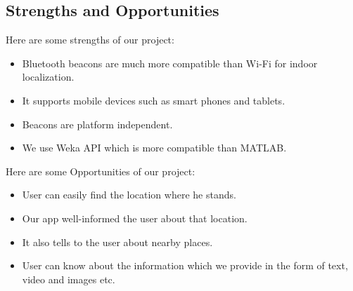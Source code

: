 \documentclass{article}
\begin{document}
\subsection{Strengths and Opportunities}

Here are some strengths of our project:
\begin{itemize}
\item Bluetooth beacons are much more compatible than Wi-Fi for indoor localization.
\item It supports mobile devices such as  smart phones and tablets. 
\item Beacons are platform independent. 
\item We use Weka API which is more compatible than MATLAB.
\end{itemize}
Here are some Opportunities of our project:
\begin{itemize}
\item User can easily find the location where he stands.
\item Our app well-informed the user about that location.
\item It also tells to the user about nearby places.
\item User can know about the information which we provide in the form of text, video and images etc.
\end{itemize}
\pagebreak
\end{document}
